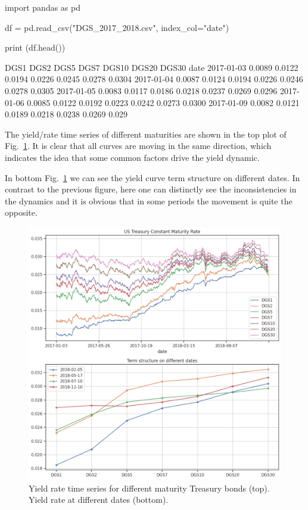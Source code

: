 \begin{enumerate}
\begin{ipython}
import pandas as pd

df = pd.read_csv("DGS_2017_2018.csv", index_col="date")

print (df.head())
\end{ipython}
\begin{ioutput}
DGS1    DGS2    DGS5    DGS7   DGS10   DGS20   DGS30
date                                                              
2017-01-03  0.0089  0.0122  0.0194  0.0226  0.0245  0.0278  0.0304
2017-01-04  0.0087  0.0124  0.0194  0.0226  0.0246  0.0278  0.0305
2017-01-05  0.0083  0.0117  0.0186  0.0218  0.0237  0.0269  0.0296
2017-01-06  0.0085  0.0122  0.0192  0.0223  0.0242  0.0273  0.0300
2017-01-09  0.0082  0.0121  0.0189  0.0218  0.0238  0.0269  0.029
\end{ioutput}

The yield/rate time series of different maturities are shown in the top plot of Fig.~\ref{fig:yield_rate_ts}. It is clear that all curves are moving in the same direction, which indicates the idea that some common factors drive the yield dynamic.

In bottom Fig.~\ref{fig:yield_rate_ts} we can see the yield curve term structure on different dates. In contrast to the previous figure, here one can distinctly see the inconsistencies in the dynamics and it is obvious that in some periods the movement is quite the opposite.

\begin{figure}[htbp]
	\centering
	\includegraphics[width=0.7\linewidth]{figures/yield_rate_ts}
	\caption{Yield rate time series for different maturity Treasury bonds (top). Yield rate at different dates (bottom).}
	\label{fig:yield_rate_ts}
\end{figure}


\end{enumerate}
